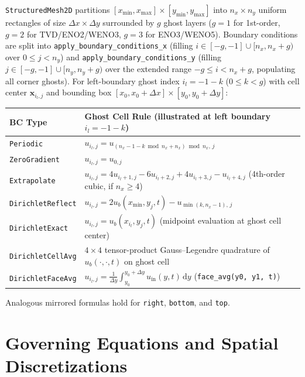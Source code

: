 \documentclass[11pt,a4paper]{article}
\theoremstyle{definition}
\newcommand{\dd}{\mathrm{d}}
\newcommand{\code}[1]{\texttt{#1}}
\begin{document}
\code{StructuredMesh2D} partitions $[x_{\min},x_{\max}]\times[y_{\min},y_{\max}]$ into $n_x\times n_y$ uniform rectangles of size $\Delta x \times \Delta y$ surrounded by $g$ ghost layers ($g=1$ for 1st-order, $g=2$ for TVD/ENO2/WENO3, $g=3$ for ENO3/WENO5). Boundary conditions are split into \code{apply\_boundary\_conditions\_x} (filling $i\in[-g,-1]\cup[n_x,n_x+g)$ over $0\le j<n_y$) and \code{apply\_boundary\_conditions\_y} (filling $j\in[-g,-1]\cup[n_y,n_y+g)$ over the extended range $-g \le i < n_x + g$, populating all corner ghosts). For left-boundary ghost index $i_l = -1 - k$ ($0\le k < g$) with cell center $\mathbf{x}_{i_l,j}$ and bounding box $[x_0,x_0+\Delta x]\times[y_0,y_0+\Delta y]$:
\begin{center}
\footnotesize
\begin{tabular}{@{}l p{}@{}}
\toprule
\textbf{BC Type} & \textbf{Ghost Cell Rule (illustrated at left boundary $i_l = -1-k$)} \\
\midrule
\code{Periodic} & $u_{i_l, j} = u_{(n_x - 1 - k \bmod n_x + n_x)\bmod n_x,\, j}$ \\
\code{ZeroGradient} & $u_{i_l, j} = u_{0, j}$ \\
\code{Extrapolate} & $u_{i_l, j} = 4 u_{i_l+1, j} - 6 u_{i_l+2, j} + 4 u_{i_l+3, j} - u_{i_l+4, j}$ (4th-order cubic, if $n_x\ge 4$) \\
\code{DirichletReflect} & $u_{i_l, j} = 2 u_b(x_{\min}, y_j, t) - u_{\min(k, n_x-1),\, j}$ \\
\code{DirichletExact} & $u_{i_l, j} = u_b(x_{i_l}, y_j, t)$ (midpoint evaluation at ghost cell center) \\
\code{DirichletCellAvg} & $4\times 4$ tensor-product Gauss--Legendre quadrature of $u_b(\cdot,\cdot,t)$ on ghost cell \\
\code{DirichletFaceAvg} & $u_{i_l, j} = \frac{1}{\Delta y}\int_{y_0}^{y_0+\Delta y} u_{\text{in}}(y, t)\,\dd y$ (\code{face\_avg(y0, y1, t)}) \\
\bottomrule
\end{tabular}
\end{center}
Analogous mirrored formulas hold for \code{right}, \code{bottom}, and \code{top}.

\section{Governing Equations and Spatial Discretizations}
\end{document}
